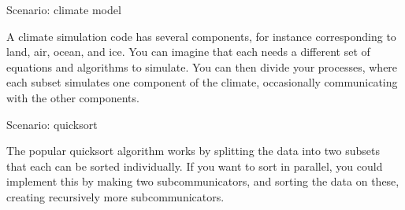  {Scenario: climate model}

A climate simulation code has several components, for instance corresponding
to land, air, ocean, and ice. You can imagine that each needs a different set
of equations and algorithms to simulate. You can then divide your processes,
where each subset simulates one component of the climate, occasionally communicating
with the other components.

 {Scenario: quicksort}

The popular quicksort algorithm works by splitting the data
into two subsets that each can be sorted individually.
If you want to sort in parallel, you could implement this by making two subcommunicators,
and sorting the data on these, creating recursively more subcommunicators.










